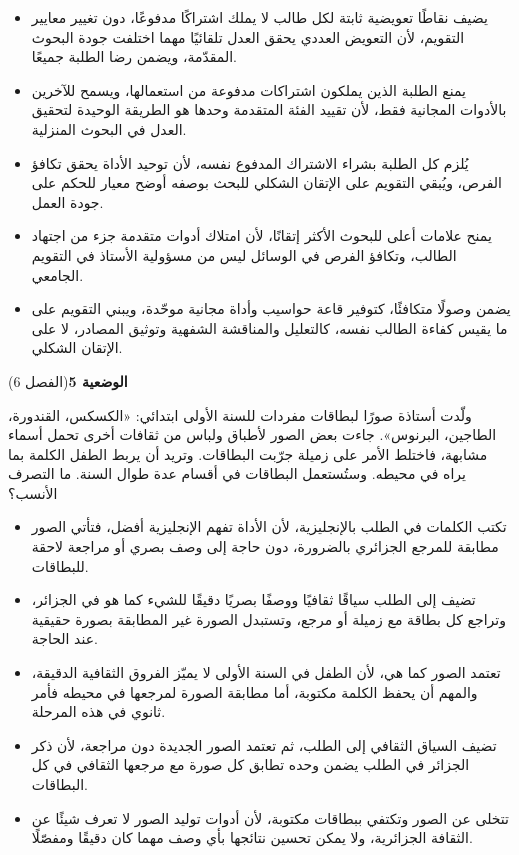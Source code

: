 \documentclass[11pt,a4paper]{article}
\begin{document}
\begin{itemize}[leftmargin=1.0cm, labelsep=6pt, itemsep=3pt, topsep=4pt, parsep=0pt]
  \item[\textbf{أ)}] يضيف نقاطًا تعويضية ثابتة لكل طالب لا يملك اشتراكًا مدفوعًا، دون تغيير معايير التقويم، لأن التعويض العددي يحقق العدل تلقائيًا مهما اختلفت جودة البحوث المقدّمة، ويضمن رضا الطلبة جميعًا.
  \item[\textbf{ب)}] يمنع الطلبة الذين يملكون اشتراكات مدفوعة من استعمالها، ويسمح للآخرين بالأدوات المجانية فقط، لأن تقييد الفئة المتقدمة وحدها هو الطريقة الوحيدة لتحقيق العدل في البحوث المنزلية.
  \item[\textbf{ج)}] يُلزم كل الطلبة بشراء الاشتراك المدفوع نفسه، لأن توحيد الأداة يحقق تكافؤ الفرص، ويُبقي التقويم على الإتقان الشكلي للبحث بوصفه أوضح معيار للحكم على جودة العمل.
  \item[\textbf{د)}] يمنح علامات أعلى للبحوث الأكثر إتقانًا، لأن امتلاك أدوات متقدمة جزء من اجتهاد الطالب، وتكافؤ الفرص في الوسائل ليس من مسؤولية الأستاذ في التقويم الجامعي.
  \item[\textbf{هـ)}] يضمن وصولًا متكافئًا، كتوفير قاعة حواسيب وأداة مجانية موحّدة، ويبني التقويم على ما يقيس كفاءة الطالب نفسه، كالتعليل والمناقشة الشفهية وتوثيق المصادر، لا على الإتقان الشكلي.
\end{itemize}
\par\vspace{6pt}
\noindent
{\large\khatt\textbf{الوضعية 5}}\hfill{\small(الفصل 6)}\par\nopagebreak\vspace{3pt}
\setlength{\fboxsep}{7pt}\colorbox{gray!10}{\parbox{\dimexpr\linewidth-14pt}{ولّدت أستاذة صورًا لبطاقات مفردات للسنة الأولى ابتدائي: «الكسكس، القندورة، الطاجين، البرنوس». جاءت بعض الصور لأطباق ولباس من ثقافات أخرى تحمل أسماء مشابهة، فاختلط الأمر على زميلة جرّبت البطاقات. وتريد أن يربط الطفل الكلمة بما يراه في محيطه. وستُستعمل البطاقات في أقسام عدة طوال السنة. ما التصرف الأنسب؟}}\par\nopagebreak
\begin{itemize}[leftmargin=1.0cm, labelsep=6pt, itemsep=3pt, topsep=4pt, parsep=0pt]
  \item[\textbf{أ)}] تكتب الكلمات في الطلب بالإنجليزية، لأن الأداة تفهم الإنجليزية أفضل، فتأتي الصور مطابقة للمرجع الجزائري بالضرورة، دون حاجة إلى وصف بصري أو مراجعة لاحقة للبطاقات.
  \item[\textbf{ب)}] تضيف إلى الطلب سياقًا ثقافيًا ووصفًا بصريًا دقيقًا للشيء كما هو في الجزائر، وتراجع كل بطاقة مع زميلة أو مرجع، وتستبدل الصورة غير المطابقة بصورة حقيقية عند الحاجة.
  \item[\textbf{ج)}] تعتمد الصور كما هي، لأن الطفل في السنة الأولى لا يميّز الفروق الثقافية الدقيقة، والمهم أن يحفظ الكلمة مكتوبة، أما مطابقة الصورة لمرجعها في محيطه فأمر ثانوي في هذه المرحلة.
  \item[\textbf{د)}] تضيف السياق الثقافي إلى الطلب، ثم تعتمد الصور الجديدة دون مراجعة، لأن ذكر الجزائر في الطلب يضمن وحده تطابق كل صورة مع مرجعها الثقافي في كل البطاقات.
  \item[\textbf{هـ)}] تتخلى عن الصور وتكتفي ببطاقات مكتوبة، لأن أدوات توليد الصور لا تعرف شيئًا عن الثقافة الجزائرية، ولا يمكن تحسين نتائجها بأي وصف مهما كان دقيقًا ومفصّلًا.
\end{itemize}
\end{document}
